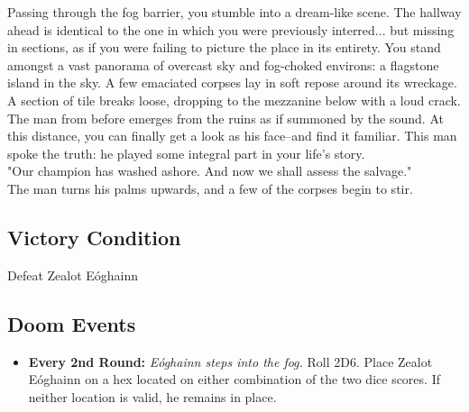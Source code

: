 Passing through the fog barrier, you stumble into a dream-like scene. The hallway ahead is identical to the one in which you were previously interred... but missing in sections, as if you were failing to picture the place in its entirety. You stand amongst a vast panorama of overcast sky and fog-choked environs: a flagstone island in the sky. A few emaciated corpses lay in soft repose around its wreckage.\\

A section of tile breaks loose, dropping to the mezzanine below with a loud crack.\\

The man from before emerges from the ruins as if summoned by the sound. At this distance, you can finally get a look as his face--and find it familiar. This man spoke the truth: he played some integral part in your life's story.\\

"Our champion has washed ashore. And now we shall assess the salvage."\\

The man turns his palms upwards, and a few of the corpses begin to stir.\\

\subsection*{Victory Condition}
Defeat Zealot Eóghainn

\subsection*{Doom Events}
\begin{itemize}
\item \textbf{Every 2nd Round:} \emph{Eóghainn steps into the fog.} Roll 2D6. Place Zealot Eóghainn on a hex located on either combination of the two dice scores. If neither location is valid, he remains in place.
\end{itemize}

